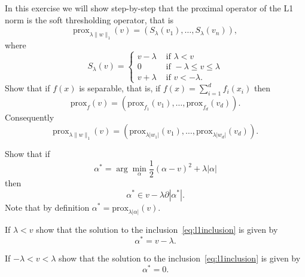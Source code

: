 \documentclass[11pt]{article}
\newcommand{\norm}[1]{\lVert#1\rVert}
\begin{document}
 
\begin{ExerciseList}
    \Exercise  In this exercise we will show step-by-step that the proximal operator of the L1 norm is the soft thresholding operator, that is
  \begin{equation}\label{eq:l1prox}
  \mbox{prox}_{\lambda \norm{w}_1} (v) =  \left(S_{\lambda}(v_1) ,\ldots, S_{\lambda}(v_n)\right),
  \end{equation}
  where
  \begin{equation}\label{eq:softth}
 S_{\lambda}(v)  = 
\begin{cases}
v- \lambda & \mbox{ if } \lambda <v\\
0 & \mbox{ if } -\lambda\leq v\leq \lambda\\
v+\lambda & \mbox{ if } v<  -\lambda.
\end{cases}
  \end{equation}
      \newpage
  \ExePart \label{I} Show that if $f(x)$ is separable, that is, if $f(x) = \sum_{i=1}^d f_i(x_i)$ then 
  \begin{equation}
  \mbox{prox}_{f}(v) = (\mbox{prox}_{f_1}(v_1),\ldots, \mbox{prox}_{f_d}(v_d)).
  \end{equation}
Consequently  
\[  \mbox{prox}_{\lambda \norm{w}_1} (v)  =  (\mbox{prox}_{\lambda|w_1|}(v_1),\ldots, \mbox{prox}_{\lambda|w_d|}(v_d)). \]
   
    \ExePart \label{II} Show that if 
    \begin{equation} \label{eq:alphstdef}\alpha^* = \arg\min_\alpha \frac{1}{2}(\alpha -v)^2+\lambda |\alpha|\end{equation}
    then 
    \begin{equation}\label{eq:l1inclusion}
    \alpha^* \in v - \lambda \partial |\alpha^*|.
    \end{equation}
    Note that by definition $\alpha^* = \mbox{prox}_{\lambda |\alpha|}(v)$.
      
     \ExePart \label{III} If $\lambda < v$ show that the solution to the inclusion~\eqref{eq:l1inclusion} is given by
     \[ \alpha^* = v-\lambda.\]
        
     \ExePart \label{IV} If $-\lambda < v < \lambda$ show that the solution to the inclusion~\eqref{eq:l1inclusion} is given by
     \[ \alpha^* = 0.\]
        

\end{ExerciseList}
\end{document}
